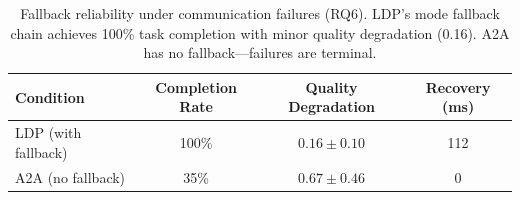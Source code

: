 \begin{table}[t]
\centering
\caption{Fallback reliability under communication failures (RQ6). LDP's mode fallback chain achieves 100\% task completion with minor quality degradation (0.16). A2A has no fallback---failures are terminal.}
\label{tab:fallback}
\begin{tabular}{lccc}
\toprule
Condition & Completion Rate & Quality Degradation & Recovery (ms) \\
\midrule
LDP (with fallback) & 100\% & $0.16 \pm 0.10$ & 112 \\
A2A (no fallback) & 35\% & $0.67 \pm 0.46$ & 0 \\
\bottomrule
\end{tabular}
\end{table}
